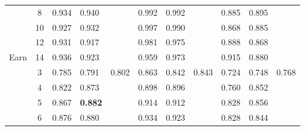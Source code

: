 \begin{table}[]
\begin{tabular}{|c|c|l|l|l|l|l|l|l|l|l|}
                       & 8                     & \cellcolor[HTML]{EFEFEF}0.934          & \cellcolor[HTML]{EFEFEF}0.940          & \cellcolor[HTML]{EFEFEF}      & 0.992    & 0.992    &          & \cellcolor[HTML]{EFEFEF}0.885 & \cellcolor[HTML]{EFEFEF}0.895 & \cellcolor[HTML]{EFEFEF}      \\ \cline{2-11} 
                       & 10                    & \cellcolor[HTML]{EFEFEF}0.927          & \cellcolor[HTML]{EFEFEF}0.932          & \cellcolor[HTML]{EFEFEF}      & 0.997    & 0.990    &          & \cellcolor[HTML]{EFEFEF}0.868 & \cellcolor[HTML]{EFEFEF}0.885 & \cellcolor[HTML]{EFEFEF}      \\ \cline{2-11} 
                       & 12                    & \cellcolor[HTML]{EFEFEF}0.931          & \cellcolor[HTML]{EFEFEF}0.917          & \cellcolor[HTML]{EFEFEF}      & 0.981    & 0.975    &          & \cellcolor[HTML]{EFEFEF}0.888 & \cellcolor[HTML]{EFEFEF}0.868 & \cellcolor[HTML]{EFEFEF}      \\ \cline{2-11} 
\multirow{-9}{*}{Earn} & 14                    & \cellcolor[HTML]{EFEFEF}0.936          & \cellcolor[HTML]{EFEFEF}0.923          & \cellcolor[HTML]{EFEFEF}      & 0.959    & 0.973    &          & \cellcolor[HTML]{EFEFEF}0.915 & \cellcolor[HTML]{EFEFEF}0.880 & \cellcolor[HTML]{EFEFEF}      \\ \hline
                       & 3                     & \cellcolor[HTML]{EFEFEF}0.785		& \cellcolor[HTML]{EFEFEF}0.791          & \cellcolor[HTML]{EFEFEF}0.802 & 0.863    & 0.842    & 0.843    & \cellcolor[HTML]{EFEFEF}0.724 & \cellcolor[HTML]{EFEFEF}0.748 & \cellcolor[HTML]{EFEFEF}0.768  \\ \cline{2-11} 
                       & 4                     & \cellcolor[HTML]{EFEFEF}0.822          & \cellcolor[HTML]{EFEFEF}0.873		 & \cellcolor[HTML]{EFEFEF}      & 0.898    & 0.896    &          & \cellcolor[HTML]{EFEFEF}0.760 & \cellcolor[HTML]{EFEFEF}0.852 & \cellcolor[HTML]{EFEFEF}      \\ \cline{2-11} 
                       & 5                     & \cellcolor[HTML]{EFEFEF}0.867          & \cellcolor[HTML]{EFEFEF}\textbf{0.882} & \cellcolor[HTML]{EFEFEF}      & 0.914    & 0.912    &          & \cellcolor[HTML]{EFEFEF}0.828 & \cellcolor[HTML]{EFEFEF}0.856 & \cellcolor[HTML]{EFEFEF}      \\ \cline{2-11} 
                       & 6                     & \cellcolor[HTML]{EFEFEF}0.876          & \cellcolor[HTML]{EFEFEF}0.880		 & \cellcolor[HTML]{EFEFEF}      & 0.934    & 0.923    &          & \cellcolor[HTML]{EFEFEF}0.828 & \cellcolor[HTML]{EFEFEF}0.844 & \cellcolor[HTML]{EFEFEF}      \\ \cline{2-11} 

\end{tabular}
\end{table}
